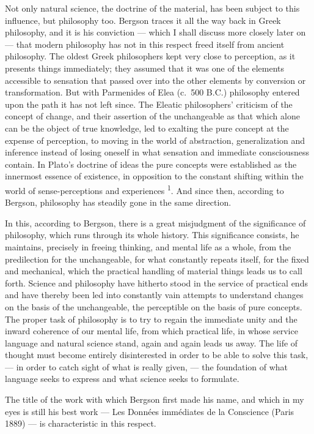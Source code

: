 \documentclass[12pt,a4paper,openany]{book}
\newcommand{\opage}[1]{\marginnote{\footnotesize\textit{[#1]}}}
\newcommand{\nm}[1]{\unskip\textsuperscript{#1}}
\begin{document}
Not only natural science, the doctrine of the material, has been subject to this influence, but philosophy too. Bergson traces it all the way back in Greek philosophy, and it is his conviction --- which I shall discuss more closely later on --- that modern philosophy has not in this respect freed itself from ancient philosophy. The oldest Greek philosophers kept very close to perception, as it presents things immediately; they assumed that it was one of the elements accessible to sensation that passed over into the other elements by conversion or transformation. But with Parmenides of Elea (c.\ 500 B.C.) philosophy entered upon the path it has not left since. The Eleatic philosophers' criticism of the concept of change, and their assertion of the unchangeable as that which alone can be the object of true knowledge, led to exalting the pure concept at the expense of perception, to moving in the world of abstraction, generalization and inference instead of losing oneself in what sensation and immediate consciousness contain. In Plato's doctrine of ideas the pure concepts were established as the innermost essence of existence, in opposition to the constant shifting within the world of sense-perceptions and
\opage{3}experiences \nm{1}. And since then, according to Bergson, philosophy has steadily gone in the same direction.

In this, according to Bergson, there is a great misjudgment of the significance of philosophy, which runs through its whole history. This significance consists, he maintains, precisely in freeing thinking, and mental life as a whole, from the predilection for the unchangeable, for what constantly repeats itself, for the fixed and mechanical, which the practical handling of material things leads us to call forth. Science and philosophy have hitherto stood in the service of practical ends and have thereby been led into constantly vain attempts to understand changes on the basis of the unchangeable, the perceptible on the basis of pure concepts. The proper task of philosophy is to try to regain the immediate unity and the inward coherence of our mental life, from which practical life, in whose service language and natural science stand, again and again leads us away. The life of thought must become entirely disinterested in order to be able to solve this task, --- in order to catch sight of what is really given, --- the foundation of what language seeks to express and what science seeks to formulate.

The title of the work with which Bergson first made his name, and which in my eyes is still his best work --- Les Données immédiates de la Conscience (Paris 1889) --- is characteristic in this respect.
\end{document}

